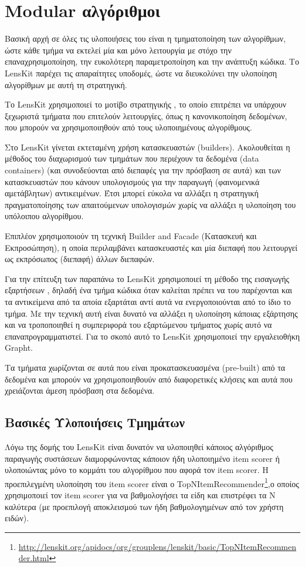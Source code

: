 \section{\en Modular \el αλγόριθμοι}
Βασική αρχή σε όλες τις υλοποιήσεις του είναι η τμηματοποίηση των αλγορίθμων, ώστε κάθε τμήμα να εκτελεί μία και μόνο λειτουργία με στόχο την επαναχρησιμοποίηση, την ευκολότερη παραμετροποίηση και την ανάπτυξη κώδικα. Το \en LensKit \el παρέχει τις απαραίτητες υποδομές, ώστε να διευκολύνει την υλοποίηση αλγορίθμων με αυτή τη στρατηγική. \par Το \en LensKit \el χρησιμοποιεί το μοτίβο στρατηγικής \cite{Gamma:1995:DPE:186897}, το οποίο επιτρέπει να υπάρχουν ξεχωριστά τμήματα που επιτελούν λειτουργίες, όπως η κανονικοποίηση δεδομένων, που μπορούν να χρησιμοποιηθούν από τους υλοποιημένους αλγορίθμους. \par
Στο {\en LensKit} γίνεται εκτεταμένη χρήση κατασκευαστών (\en builders)\el. Ακολουθεί\-ται η μέθοδος του διαχωρισμού των τμημάτων που περιέχουν τα δεδομένα (\en data containers) \el (και συνοδεύονται από διεπαφές για την πρόσβαση σε αυτά) και των κατασκευαστών που κάνουν υπολογισμούς για την παραγωγή (φαινομενικά αμετάβλητων) αντικειμένων. Έτσι μπορεί εύκολα να αλλάξει η στρατηγική πραγματοποίησης των απαιτούμενων υπολογισμών χωρίς να αλλάξει η υλοποίηση του υπόλοιπου αλγορίθμου. \par
Επιπλέον χρησιμοποιούν τη τεχνική \en Builder and Facade \el\cite{Gamma:1995:DPE:186897} (Κατασκευή και Εκπροσώπηση), η οποία περιλαμβάνει κατασκευαστές και μία διεπαφή που λειτουργεί ως εκπρόσωπος (διεπαφή) άλλων διεπαφών. \par
Για την επίτευξη των παραπάνω το {\en LensKit} χρησιμοποιεί τη μέθοδο της εισαγωγής εξαρτήσεων \cite{mar96c}, δηλαδή ένα τμήμα κώδικα όταν καλείται πρέπει να του παρέχονται και τα αντικείμενα από τα αποία εξαρτάται αντί αυτά να ενεργοποιού\-νται από το ίδιο το τμήμα. Με την τεχνική αυτή είναι δυνατό να αλλάξει η υλοποίηση κάποιας εξάρτησης και να τροποποιηθεί η συμπεριφορά του εξαρτώμενου τμήματος χωρίς αυτό να επαναπρογραμματιστεί. Για το σκοπό αυτό το {\en LensKit} χρησιμοποιεί την εργαλειοθήκη {\en Grapht}. \par
Τα τμήματα χωρίζονται σε αυτά που είναι προκατασκευασμένα (\en pre-built) \el από τα δεδομένα και μπορούν να χρησιμοποιηθουύν από διαφορετικές κλήσεις και αυτά που χρειάζονται άμεση πρόσβαση στα δεδομένα.
\subsection{Βασικές Υλοποιήσεις Τμημάτων}
Λόγω της δομής του \en LensKit \el είναι δυνατόν να υλοποιηθεί κάποιος αλγόριθμος παραγωγής συστάσεων διαμορφώνοντας κάποιον ήδη υλοποιημένο \en item scorer \el ή υλοποιώντας μόνο το κομμάτι του αλγορίθμου που αφορά τον \en item scorer. \el H προεπιλεγμένη υλοποίηση του \en item scorer \el είναι ο \en TopNItemRecommender\footnote{\url{http://lenskit.org/apidocs/org/grouplens/lenskit/basic/TopNItemRecommender.html}},\el ο οποίος χρησιμοποιεί τον \en item scorer \el για να βαθμολογήσει τα είδη και επιστρέφει τα Ν καλύτερα (με προεπιλογή αποκλεισμού των ήδη βαθμολογημένων από τον χρήστη ειδών).\el
